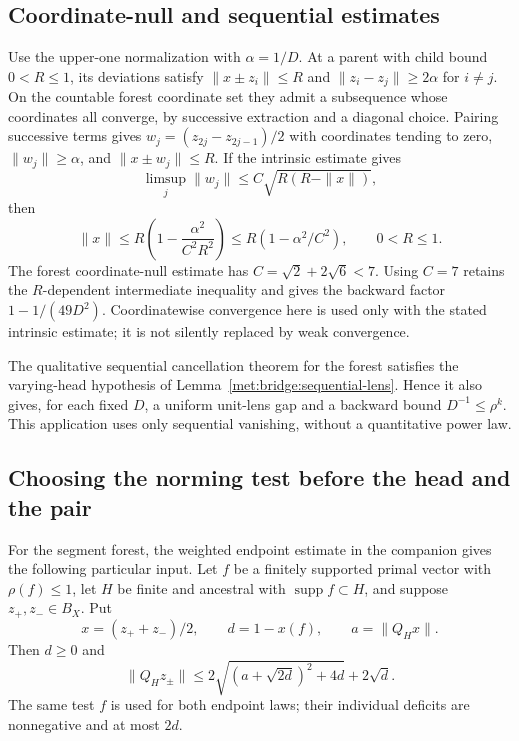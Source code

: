 \subsection{Coordinate-null and sequential estimates}
Use the upper-one normalization with $\alpha=1/D$. At a parent with
child bound $0<R\le1$, its deviations satisfy $\|x\pm z_i\|\le R$
and $\|z_i-z_j\|\ge2\alpha$ for $i\ne j$.
On the countable forest coordinate set they admit a subsequence whose coordinates
all converge, by successive extraction and a diagonal choice. Pairing
successive terms gives $w_j=(z_{2j}-z_{2j-1})/2$ with coordinates tending
to zero, $\|w_j\|\ge\alpha$, and $\|x\pm w_j\|\le R$.
If the intrinsic estimate gives
\[
 \limsup_j\|w_j\|\le C\sqrt{R(R-\|x\|)},
\]
then
\[
 \|x\|\le R\left(1-\frac{\alpha^2}{C^2R^2}\right)
 \le R(1-\alpha^2/C^2),\qquad0<R\le1.
\]
The forest coordinate-null estimate
\cite[Corollary~23.5]{SegmentLenses} has
$C=\sqrt2+2\sqrt6<7$. Using $C=7$ retains the
$R$-dependent intermediate inequality and gives the backward factor
$1-1/(49D^2)$. Coordinatewise convergence here is used only with the
stated intrinsic estimate; it is not silently replaced by weak convergence.


The qualitative sequential cancellation theorem for the forest
\cite[Lemma~23.2]{SegmentLenses} satisfies the varying-head hypothesis
of Lemma~\ref{met:bridge:sequential-lens}. Hence it also gives, for each
fixed $D$, a uniform unit-lens gap and a backward bound $D^{-1}\le\rho^k$.
This application uses only sequential vanishing, without a quantitative
power law.

\subsection{Choosing the norming test before the head and the pair}
\label{met:bridge:normer-section}
For the segment forest, the weighted endpoint estimate in the
companion \cite[Theorem~16.1 and equation~(16.2)]{SegmentLenses} gives the following particular input.
Let $f$ be a finitely supported primal vector with $\rho(f)\le1$,
let $H$ be finite and ancestral with $\operatorname{supp}f\subset H$,
and suppose $z_+,z_-\in B_X$. Put
\[
 x=(z_++z_-)/2,\qquad
 d=1-x(f),\qquad a=\|Q_Hx\|.
\]
Then $d\ge0$ and
\begin{equation}\label{met:bridge:weighted-input}
 \|Q_Hz_\pm\|
 \le2\sqrt{(a+\sqrt{2d})^2+4d}+2\sqrt d.
\end{equation}
The same test $f$ is used for both endpoint laws; their individual
deficits are nonnegative and at most $2d$.

